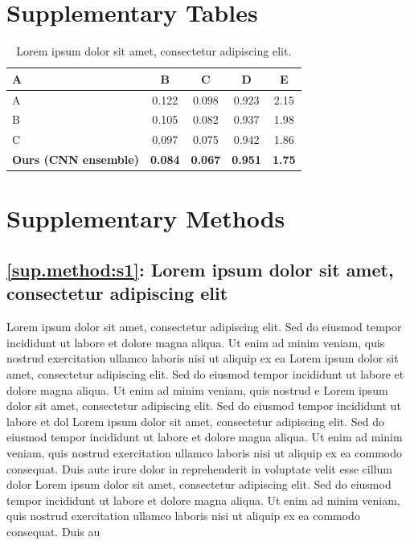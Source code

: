 \documentclass{article}
\begin{document}
\newpage
\section{Supplementary Tables}
\begin{table}[h]
\centering
\caption{Lorem ipsum dolor sit amet, consectetur adipiscing elit.}
\label{sup.tab:s1}
\begin{tabular}{lcccc}
\hline
A & B & C & D & E \\
\hline
A & 0.122 & 0.098 & 0.923 & 2.15 \\
B & 0.105 & 0.082 & 0.937 & 1.98 \\
C & 0.097 & 0.075 & 0.942 & 1.86 \\
\textbf{Ours (CNN ensemble)} & \textbf{0.084} & \textbf{0.067} & \textbf{0.951} & \textbf{1.75} \\
\hline
\end{tabular}
\end{table}
\clearpage
\section{Supplementary Methods}
\setcounter{subsection}{0}

\subsection*{\ref{sup.method:s1}: Lorem ipsum dolor sit amet, consectetur adipiscing elit}
\label{sup.method:s1}

Lorem ipsum dolor sit amet, consectetur adipiscing elit. Sed do eiusmod tempor incididunt ut labore et dolore magna aliqua. Ut enim ad minim veniam, quis nostrud exercitation ullamco laboris nisi ut aliquip ex ea 
Lorem ipsum dolor sit amet, consectetur adipiscing elit. Sed do eiusmod tempor incididunt ut labore et dolore magna aliqua. Ut enim ad minim veniam, quis nostrud e
Lorem ipsum dolor sit amet, consectetur adipiscing elit. Sed do eiusmod tempor incididunt ut labore et dol
Lorem ipsum dolor sit amet, consectetur adipiscing elit. Sed do eiusmod tempor incididunt ut labore et dolore magna aliqua. Ut enim ad minim veniam, quis nostrud exercitation ullamco laboris nisi ut aliquip ex ea commodo consequat. Duis aute irure dolor in reprehenderit in voluptate velit esse cillum dolor
Lorem ipsum dolor sit amet, consectetur adipiscing elit. Sed do eiusmod tempor incididunt ut labore et dolore magna aliqua. Ut enim ad minim veniam, quis nostrud exercitation ullamco laboris nisi ut aliquip ex ea commodo consequat. Duis au
\end{document}
